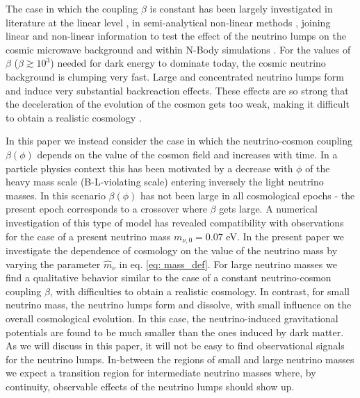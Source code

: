 The case in which the coupling $\beta$ is constant has been largely
investigated in literature at the linear level \cite{mota_neutrino_2008},
in semi-analytical non-linear methods \cite{wintergerst_clarifying_2010,wintergerst_very_2010,brouzakis_nonlinear_2011},
joining linear and non-linear information to test the effect of the
neutrino lumps on the cosmic microwave background \cite{pettorino_neutrino_2010}
and within N-Body simulations \cite{ayaita_neutrino_2013,ayaita_structure_2012,baldi_oscillating_2011,ayaita_nonlinear_2016}.
For the values of $\beta$ ($\beta\gtrsim10^{3}$) needed for dark
energy to dominate today, the cosmic neutrino background is clumping
very fast. Large and concentrated neutrino lumps form and induce very
substantial backreaction effects. These effects are so strong that
the deceleration of the evolution of the cosmon gets too weak, making
it difficult to obtain a realistic cosmology \cite{fuhrer_backreaction_2015}.

In this paper we instead consider the case in which the neutrino-cosmon
coupling $\beta(\phi)$ depends on the value of the cosmon field and
increases with time. In a particle physics context this has been motivated
\cite{wetterich_growing_2007} by a decrease with $\phi$ of the heavy
mass scale (B-L-violating scale) entering inversely the light neutrino
masses. In this scenario $\beta(\phi)$ has not been large in all
cosmological epochs - the present epoch corresponds to a crossover
where $\beta$ gets large. A numerical investigation \cite{baldi_oscillating_2011}
of this type of model has revealed compatibility with observations
for the case of a present neutrino mass $m_{\nu,0}=0.07$ eV. In the
present paper we investigate the dependence of cosmology on the value
of the neutrino mass by varying the parameter $\hat{m}_{\nu}$ in
eq. \ref{eq: mass_def}. For large neutrino masses we find a
qualitative behavior similar to the case of a constant neutrino-cosmon
coupling $\beta$, with difficulties to obtain a realistic cosmology.
In contrast, for small neutrino mass, the neutrino lumps form and
dissolve, with small influence on the overall cosmological evolution.
In this case, the neutrino-induced gravitational potentials are found
to be much smaller than the ones induced by dark matter. As we will
discuss in this paper, it will not be easy to find observational signals
for the neutrino lumps. In-between the regions of small and large
neutrino masses we expect a transition region for intermediate neutrino
masses where, by continuity, observable effects of the neutrino lumps
should show up.


